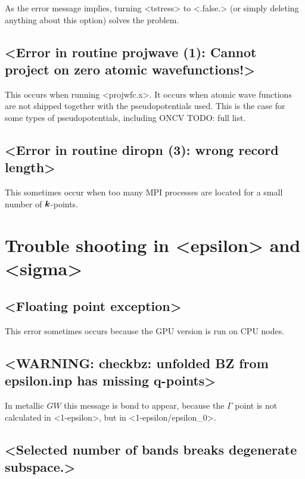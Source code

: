 \documentclass[hyperref, a4paper, 12pt]{report}
\def\texttt#1{<#1>}%
\newcommand{\shortcode}[1]{\texttt{#1}}
\begin{document}
As the error message implies,  
turning \shortcode{tstress} to \shortcode{.false.} (or simply deleting anything about this option)
solves the problem.

\subsection{\shortcode{Error in routine projwave (1): Cannot project on zero atomic wavefunctions!}}

This occurs when running \shortcode{projwfc.x}. 
It occurs when atomic wave functions are not shipped together with the pseudopotentials used. 
This is the case for some types of pseudopotentials, 
including ONCV TODO: full list.

\subsection{\shortcode{Error in routine diropn (3): wrong record length}}

This sometimes occur when too many MPI processes are located 
for a small number of $\vb*{k}$-points.

\section{Trouble shooting in \shortcode{epsilon} and \shortcode{sigma}}

\subsection{\shortcode{Floating point exception}}

This error sometimes occurs because the GPU version is run on CPU nodes.

\subsection{\shortcode{WARNING: checkbz: unfolded BZ from epsilon.inp has missing q-points}}

In metallic $GW$ this message is bond to appear,
because the $\Gamma$ point is not calculated in \shortcode{1-epsilon},
but in \shortcode{1-epsilon/epsilon_0}.

\subsection{\shortcode{Selected number of bands breaks degenerate subspace.}}\label{sec:degenerate-breaking}
\end{document}
